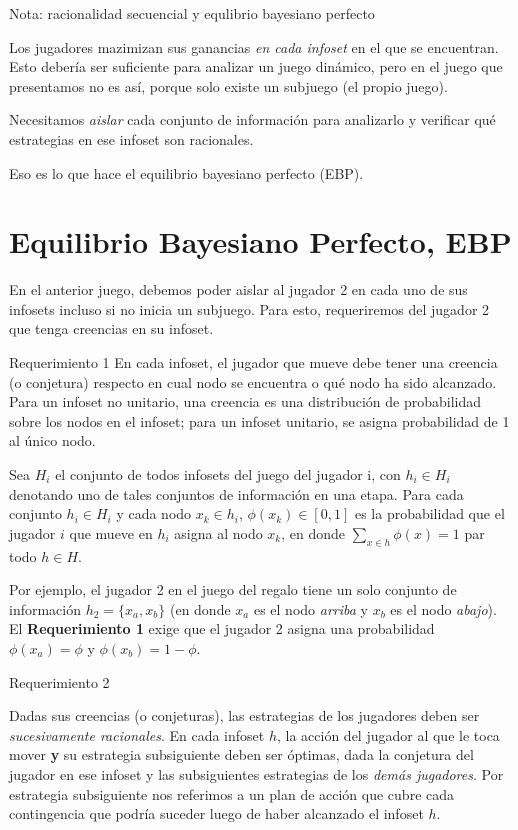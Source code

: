 \documentclass[12pt]{article}
\begin{document}
\begin{mybox}[colback=red!15, coltitle=black]{Nota: racionalidad secuencial y equlibrio bayesiano perfecto}

	Los jugadores  mazimizan sus ganancias \textit{en cada infoset} en el que se encuentran. Esto debería ser suficiente para analizar un juego dinámico, pero en el juego que presentamos no es así, porque solo existe un subjuego (el propio juego).

	Necesitamos \textit{aislar} cada conjunto de información para analizarlo y verificar qué estrategias en ese infoset son racionales.

	Eso es lo que hace el equilibrio bayesiano perfecto (EBP).

\end{mybox}

\section{Equilibrio Bayesiano Perfecto, EBP}


En el anterior juego, debemos poder aislar al jugador 2 en cada uno de sus infosets incluso si no inicia un subjuego. Para esto, requeriremos del jugador 2 que tenga creencias en su infoset.

\begin{mybox}{Requerimiento 1}
	En cada infoset, el jugador que mueve debe tener una creencia (o conjetura) respecto en cual nodo se encuentra o qué nodo ha sido alcanzado. Para un infoset no unitario, una creencia es una distribución de probabilidad sobre los nodos en el infoset; para un infoset unitario, se asigna probabilidad de 1 al único nodo.
\end{mybox}

Sea $ H_i $ el conjunto de todos infosets del juego del jugador i, con $ h_i \in H_i $ denotando uno de tales conjuntos de información en una etapa. Para cada conjunto $ h_i \in H_i $ y cada nodo $ x_k \in h_i $, $ \phi(x_k) \in [0, 1] $ es la probabilidad que el jugador $ i $ que mueve en $ h_i $ asigna al nodo $ x_k $, en donde $ \sum_{x\in h} \phi(x)=1$ par todo $ h \in H $.

Por ejemplo, el jugador 2 en el juego del regalo tiene un solo conjunto de información $ h_2 = \{x_a, x_b\} $ (en donde $ x_a $ es el nodo \textit{arriba} y $ x_b $ es el nodo \textit{abajo}). El \textbf{Requerimiento 1} exige que el jugador 2 asigna una probabilidad $ \phi(x_a) = \phi $ y $ \phi(x_b) = 1-\phi $.

\begin{mybox}{Requerimiento 2}

	Dadas sus creencias (o conjeturas), las estrategias de los jugadores deben ser \textit{sucesivamente racionales}. En cada infoset $ h $, la acción del jugador al que le toca mover \textbf{y} su estrategia subsiguiente deben ser óptimas, dada la conjetura del jugador en ese infoset y las subsiguientes estrategias de los \textit{demás jugadores}. Por estrategia subsiguiente nos referimos a un plan de acción que cubre cada contingencia que podría suceder luego de haber alcanzado el infoset $ h $.

\end{mybox}
\end{document}
